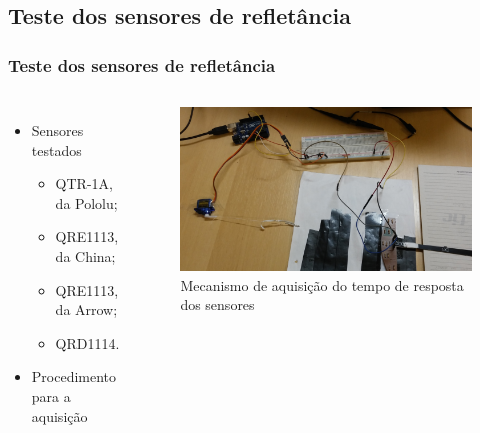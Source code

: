 
\subsection{Teste dos sensores de refletância}

\begin{frame}
\frametitle{Teste dos sensores de refletância}
\begin{columns}

	\begin{itemize}
		\item Sensores testados
		\begin{itemize}
			\item QTR-1A, da Pololu;
			\item QRE1113, da China;
			\item QRE1113, da Arrow;
			\item QRD1114.
		\end{itemize}
		\item Procedimento para a aquisição
	\end{itemize}		
	
	
	\begin{figure}[th]
	\centering
	\captionsetup{width=\textwidth,font=footnotesize,textfont=bf}
	\includegraphics[width=\textwidth,keepaspectratio]{Figuras/mecanismo.jpg}
	\caption{Mecanismo de aquisição do tempo de resposta dos sensores}
	\end{figure}
	
\end{columns}
\end{frame}

